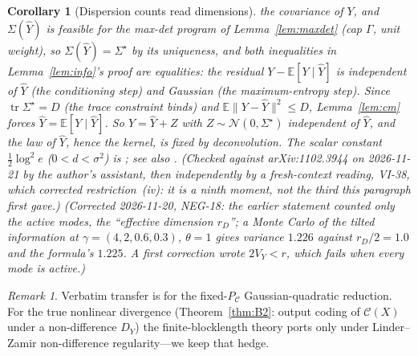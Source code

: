 \documentclass[11pt]{article}
\newtheorem{corollary}{Corollary}
\theoremstyle{definition}
\theoremstyle{remark}
\newtheorem*{remark}{Remark}
\newcommand{\PC}{P_{\mathcal{C}}}
\newcommand{\tr}{\operatorname{tr}}
\newcommand{\E}{\mathbb{E}}
\begin{document}
\begin{corollary}[Dispersion counts read dimensions]
the covariance of $Y$, and $\Sigma(\hat Y)$ is feasible for the max-det program of
Lemma~\ref{lem:maxdet} (cap $\Gamma$, unit weight), so $\Sigma(\hat Y)=\Sigma^\star$ by its
uniqueness, and both inequalities in Lemma~\ref{lem:info}'s proof are equalities: the
residual $Y-\E[Y\mid\hat Y]$ is independent of $\hat Y$ (the conditioning step) and Gaussian
(the maximum-entropy step). Since $\tr\Sigma^\star=D$ (the trace constraint binds) and
$\E\lVert Y-\hat Y\rVert^2\le D$, Lemma~\ref{lem:cm} forces $\hat Y=\E[Y\mid\hat Y]$. So
$Y=\hat Y+Z$ with $Z\sim\mathcal N(0,\Sigma^\star)$ independent of $\hat Y$, and the law of
$\hat Y$, hence the kernel, is fixed by deconvolution. The scalar constant $\tfrac12\log^2e$
($0<d<\sigma^2$) is \cite[eq.~(94)]{kostinaverdu2012}; see also \cite{ingberkochman}. (Checked
against arXiv:1102.3944 on 2026-11-21 by the author's assistant, then independently by a
fresh-context reading, VI-38, which corrected restriction~(iv): it is a ninth moment, not
the third this paragraph first gave.)
(Corrected 2026-11-20, NEG-18: the earlier statement counted only the active modes, the
``effective dimension $r_D$''; a Monte Carlo of the tilted information at
$\gamma=(4,2,0.6,0.3)$, $\theta=1$ gives variance $1.226$ against $r_D/2=1.0$ and the
formula's $1.225$. A first correction wrote $2V_Y<r$, which fails when every mode is
active.)
\end{corollary}

\begin{remark}
Verbatim transfer is for the fixed-$\PC$ Gaussian-quadratic reduction. For the true
nonlinear divergence (Theorem~\ref{thm:B2}: output coding of $\mathcal C(X)$ under a
non-difference $D_Y$) the finite-blocklength theory ports only under Linder--Zamir
\cite{linderzamir1999} non-difference regularity---we keep that hedge.
\end{remark}
\end{document}
